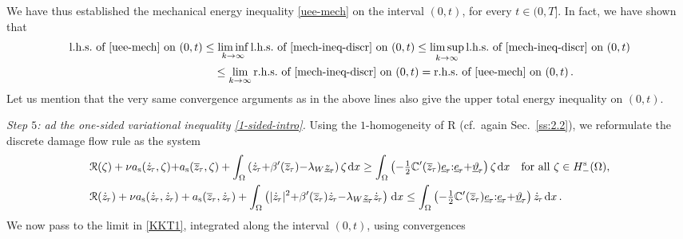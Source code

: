 \documentclass[a4paper,10pt,reqno]{amsart}
\numberwithin{equation}{section}
\numberwithin{equation}{section}
\def\dd{\;\!\mathrm{d}} %
\newcommand{\teta}{\vartheta}
\newcommand{\piecewiseConstant}[2]{\overline{#1}_{\kern-1pt#2}}
\newcommand{\pwc}{\piecewiseConstant}
\newcommand{\upiecewiseConstant}[2]{\underline{#1}_{\kern-1pt#2}}
\newcommand{\upwc}{\upiecewiseConstant}
\newcommand{\piecewiseLinear}[2]{{#1}_{\kern-1pt#2}}
\newcommand{\pwl}{\piecewiseLinear}
\newcommand{\bbC}{\mathbb{C}}
\newcommand{\Did}[1]{\mathcal{R}(#1)}
\newcommand{\didname}{\mathrm{R}}
\newcommand{\ass}{a_{\mathrm{s}}}
\newcommand{\EEE}{\color{black}}
\begin{document}
    \par
    We have thus established the mechanical energy inequality  \eqref{uee-mech} on the interval $(0,t)$, for every $t\in (0,T]$.
         In fact, we have shown that 
    \begin{equation}
    \label{mech-chain}
    \begin{aligned}
    \text{l.h.s.\ of \eqref{uee-mech} on $(0,t)$} &  \leq 
    \liminf_{k\to\infty}  \text{l.h.s.\ of \eqref{mech-ineq-discr} on $(0,t)$} 
    \leq 
     \limsup_{k\to\infty}  \text{l.h.s.\ of \eqref{mech-ineq-discr} on $(0,t)$} 
     \\
     & \quad 
    \leq  \lim_{k\to\infty}  \text{r.h.s.\ of \eqref{mech-ineq-discr} on $(0,t)$} 
    =  \text{r.h.s.\ of \eqref{uee-mech} on $(0,t)$}\,.
    \end{aligned}
    \end{equation}
    Let us mention that the very same convergence arguments as in the above lines also give the upper total energy inequality on 
     $(0,t)$. 
  \par
  \noindent
  \emph{Step $5$: ad the one-sided variational inequality \eqref{1-sided-intro}.}
  Using the $1$-homogeneity of $\didname$ (cf.\ again Sec.\ \ref{ss:2.2}),  we reformulate the discrete damage flow rule
  as the system
  \begin{subequations}
  \label{Karush-Kuhn-Tucker}
  \begin{align}
  &
  \label{KKT1}
\Did{\zeta}  +  \nu \ass( \pwl{\dot z}{\tau},\zeta) {+} \ass(\pwc z\tau,\zeta) + \int_\Omega 
 \left(
 \pwl{\dot z}{\tau} {+}\beta'(\pwc z\tau)
  {-} \lambda_W \upwc z\tau   \right)\zeta \dd x \geq \int_\Omega 
 \left( {-}\tfrac12 \bbC'(\pwc z\tau) \upwc e\tau{:} \upwc e\tau {+} \upwc \teta\tau \right) \zeta \dd x \quad 
 \text{for all } \zeta \in H_-^{\mathrm{s}}(\Omega),
 \\
  &
  \label{KKT2} 
  \Did{\pwl {\dot z}{\tau}}   +
  \nu \ass(\pwl{\dot z}{\tau}, \pwl{\dot z}{\tau}) +\ass (\pwc z{\tau}, \pwl{\dot z}{\tau}) 
  +\int_\Omega \left( |\pwl{\dot z}{\tau}|^2
  {+}\beta'(\pwc z\tau)
 \pwl{\dot z}\tau {-} \lambda_W \upwc z\tau \pwl{\dot z}{\tau} \right) \dd x 
 \leq 
  \int_\Omega 
 \left( {-}\tfrac12 \bbC'(\pwc z\tau) \upwc e\tau{:} \upwc e\tau {+} \upwc \teta\tau \right) \pwl{\dot z}\tau \dd x\,.
  \end{align}
  \end{subequations}
  We now pass to the limit in \eqref{KKT1}, integrated along the interval $(0,t)$, using convergences
\end{document}
